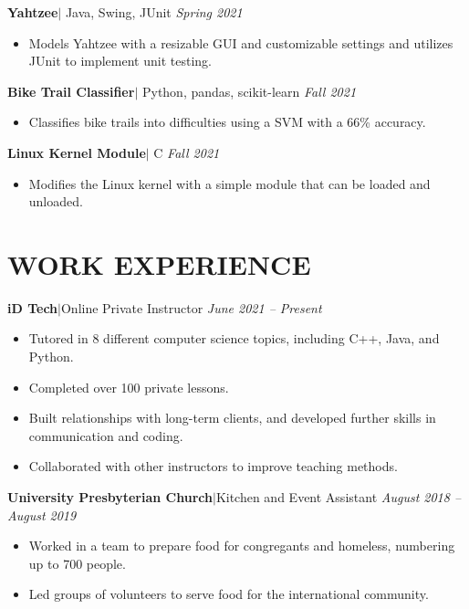 \documentclass[11pt, a4paper, roman]{moderncv}
\newcommand{\project}[5]{
	\textbf{#1}\href{#2}{\:\small\faGithub\:}$|$ #3 
	\hfill\textit{#4}
	#5
	\vspace{2mm}
}
\newcommand{\entry}[4]{
	\textbf{#1}\:$|$\:#2 
	\hfill\textit{#3}
	#4
	\vspace{2mm}
}
\begin{document}
{\project{Yahtzee}{https://github.com/Gonzaga-University/yahtzee-final-game-a-a-r-o-n}{Java, Swing, JUnit}{Spring 2021}
	{\begin{itemize}
    		\item Models Yahtzee with a resizable GUI and customizable settings and utilizes JUnit to implement unit testing.
	\end{itemize}}
}
{\project{Bike Trail Classifier}{https://github.com/GoneSahlin/BikeTrailSVM}{Python, pandas, scikit-learn}{Fall 2021}
	{\begin{itemize}
    		\item Classifies bike trails into difficulties using a SVM with a 66\% accuracy.
	\end{itemize}}
}
{\project{Linux Kernel Module}{https://github.com/GU-2021-Fall-CPSC346/hw5-linux-kernel-module-dev-GoneSahlin}{C}{Fall 2021}
	{\begin{itemize}
   		\item Modifies the Linux kernel with a simple module that can be loaded and unloaded.
	\end{itemize}}
}

\section{WORK EXPERIENCE}

\entry{iD Tech}{Online Private Instructor}{June 2021 -- Present}
	{\begin{itemize}
		\item Tutored in 8 different computer science topics, including C++, Java, and Python.
		\item Completed over 100 private lessons.
		\item Built relationships with long-term clients, and developed further skills in communication and coding.
		\item Collaborated with other instructors to improve teaching methods.
	\end{itemize}
}
{\entry{University Presbyterian Church}{Kitchen and Event Assistant}{August 2018 -- August 2019}
	{\begin{itemize}
   		\item Worked in a team to prepare food for congregants and homeless, numbering up to 700 people.
    		\item Led groups of volunteers to serve food for the international community.
  	\end{itemize}}
}
\end{document}
